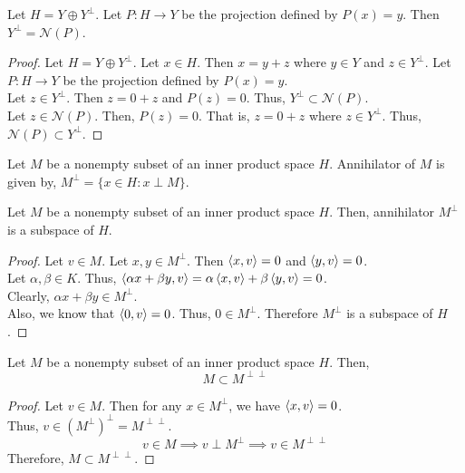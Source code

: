 \begin{lemma}
	Let $H = Y \oplus Y^\perp$.
	Let $P : H \to Y$ be the projection defined by $P(x) = y$.
	Then $Y^\perp = \mathcal{N}(P)$.
\end{lemma}
\begin{proof}
	Let $H = Y \oplus Y^\perp$.
	Let $x \in H$.
	Then $x = y+z$ where $y \in Y$ and $z \in Y^\perp$.
	Let $P : H \to Y$ be the projection defined by $P(x) = y$.\\

	Let $z \in Y^\perp$.
	Then $z = 0+z$ and $P(z) = 0$.
	Thus, $Y^\perp \subset \mathcal{N}(P)$.\\

	Let $z \in \mathcal{N}(P)$.
	Then, $P(z) = 0$.
	That is, $z = 0+z$ where $z \in Y^\perp$.
	Thus, $\mathcal{N}(P) \subset Y^\perp$.
\end{proof}

\begin{definition}[Annihilator]
	Let $M$ be a nonempty subset of an inner product space $H$.
	Annihilator of $M$ is given by, $M^\perp = \{ x \in H : x \perp M \}$.
\end{definition}

\begin{remark}
	Let $M$ be a nonempty subset of an inner product space $H$.
	Then, annihilator $M^\perp$ is a subspace of $H$.
\end{remark}
\begin{proof}
	Let $v \in M$.
	Let $x,y \in M^\perp$.
	Then $\left\langle x,v \right\rangle = 0$ and $\left\langle y,v \right\rangle = 0$.\\
	Let $\alpha,\beta \in K$.
	Thus, $\left\langle \alpha x +\beta y,v \right\rangle = \alpha \left\langle x,v \right\rangle + \beta \left\langle y,v \right\rangle = 0$.\\
	Clearly, $\alpha x + \beta y \in M^\perp$.\\

	Also, we know that $\left\langle 0,v \right\rangle = 0$.
	Thus, $0 \in M^\perp$.
	Therefore $M^\perp$ is a subspace of $H$.
\end{proof}

\begin{remark}
	Let $M$ be a nonempty subset of an inner product space $H$.
	Then,
	\[ M \subset M^{\perp\perp} \]
\end{remark}
\begin{proof}
	Let $v \in M$.
	Then for any $x \in M^\perp$, we have $\left\langle x,v \right\rangle = 0$.\\
	Thus, $v \in (M^\perp)^\perp = M^{\perp\perp}$.
	\[ v \in M \implies v \perp M^\perp \implies v \in M^{\perp\perp} \]
	Therefore, $M \subset M^{\perp\perp}$.
\end{proof}

